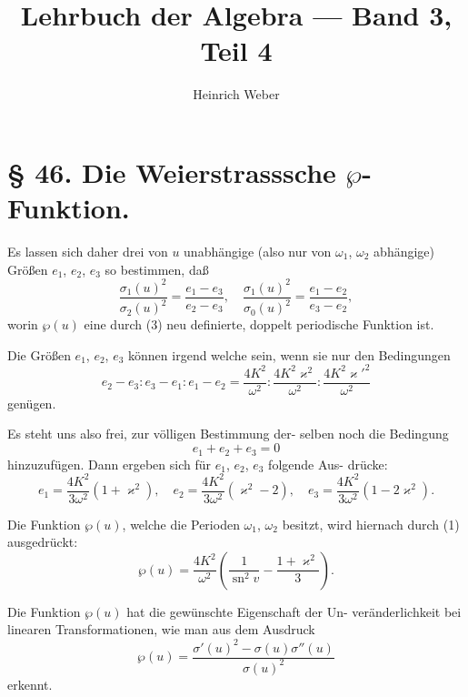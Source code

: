 \documentclass[12pt,a4paper]{article}
\title{Lehrbuch der Algebra --- Band 3, Teil 4}
\author{Heinrich Weber}
\date{}
\theoremstyle{definition}
\begin{document}
\maketitle

\section*{\S{} 46. Die Weierstrasssche $\wp$-Funktion.}

Es lassen sich daher drei von $u$ unabh\"{a}ngige (also nur von
$\omega_1$, $\omega_2$ abh\"{a}ngige) Gr\"{o}\ss en $e_1$, $e_2$, $e_3$ so bestimmen, da\ss
\begin{equation}\tag{3}
\frac{\sigma_1(u)^2}{\sigma_2(u)^2} = \frac{e_1 - e_3}{e_2 - e_3}, \quad
\frac{\sigma_1(u)^2}{\sigma_0(u)^2} = \frac{e_1 - e_2}{e_3 - e_2},
\end{equation}
worin $\wp(u)$ eine durch (3) neu definierte, doppelt periodische
Funktion ist.

Die Gr\"{o}\ss en $e_1$, $e_2$, $e_3$ k\"{o}nnen irgend welche sein,
wenn sie nur den Bedingungen
\begin{equation}\tag{4}
e_2 - e_3 : e_3 - e_1 : e_1 - e_2 = \frac{4K^2}{\omega^2} : \frac{4K^2\varkappa^2}{\omega^2} : \frac{4K^2\varkappa'^2}{\omega^2}
\end{equation}
gen\"{u}gen.

Es steht uns also frei, zur v\"{o}lligen Bestimmung der-
selben noch die Bedingung
\begin{equation}\tag{5}
e_1 + e_2 + e_3 = 0
\end{equation}
hinzuzuf\"{u}gen. Dann ergeben sich f\"{u}r $e_1$, $e_2$, $e_3$ folgende Aus-
dr\"{u}cke:
\begin{equation}\tag{6}
e_1 = \frac{4K^2}{3\omega^2}(1 + \varkappa^2), \quad
e_2 = \frac{4K^2}{3\omega^2}(\varkappa^2 - 2), \quad
e_3 = \frac{4K^2}{3\omega^2}(1 - 2\varkappa^2).
\end{equation}

Die Funktion $\wp(u)$, welche die Perioden $\omega_1$, $\omega_2$ besitzt, wird
hiernach durch (1) ausgedr\"{u}ckt:
\begin{equation}\tag{7}
\wp(u) = \frac{4K^2}{\omega^2} \left(\frac{1}{\operatorname{sn}^2 v} - \frac{1 + \varkappa^2}{3}\right).
\end{equation}

Die Funktion $\wp(u)$ hat die gew\"{u}nschte Eigenschaft der Un-
ver\"{a}nderlichkeit bei linearen Transformationen, wie man aus dem
Ausdruck
\begin{equation}\tag{8}
\wp(u) = \frac{\sigma'(u)^2 - \sigma(u)\sigma''(u)}{\sigma(u)^2}
\end{equation}
erkennt.
\end{document}
